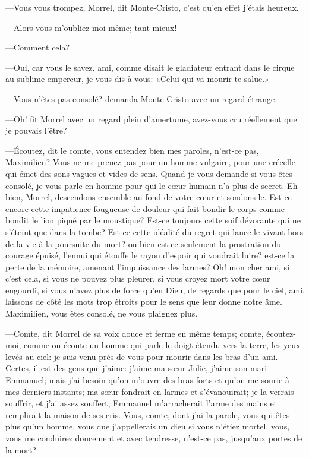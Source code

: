 —Vous vous trompez, Morrel, dit Monte-Cristo, c'est qu'en effet j'étais heureux. 

—Alors vous m'oubliez moi-même; tant mieux! 

—Comment cela? 

—Oui, car vous le savez, ami, comme disait le gladiateur entrant dans le cirque au sublime empereur, je vous dis à vous: «Celui qui va mourir te salue.» 

—Vous n'êtes pas consolé? demanda Monte-Cristo avec un regard étrange. 

—Oh! fit Morrel avec un regard plein d'amertume, avez-vous cru réellement que je pouvais l'être? 

—Écoutez, dit le comte, vous entendez bien mes paroles, n'est-ce pas, Maximilien? Vous ne me prenez pas pour un homme vulgaire, pour une crécelle qui émet des sons vagues et vides de sens. Quand je vous demande si vous êtes consolé, je vous parle en homme pour qui le cœur humain n'a plus de secret. Eh bien, Morrel, descendons ensemble au fond de votre cœur et sondons-le. Est-ce encore cette impatience fougueuse de douleur qui fait bondir le corps comme bondit le lion piqué par le moustique? Est-ce toujours cette soif dévorante qui ne s'éteint que dans la tombe? Est-ce cette idéalité du regret qui lance le vivant hors de la vie à la poursuite du mort? ou bien est-ce seulement la prostration du courage épuisé, l'ennui qui étouffe le rayon d'espoir qui voudrait luire? est-ce la perte de la mémoire, amenant l'impuissance des larmes? Oh! mon cher ami, si c'est cela, si vous ne pouvez plus pleurer, si vous croyez mort votre cœur engourdi, si vous n'avez plus de force qu'en Dieu, de regards que pour le ciel, ami, laissons de côté les mots trop étroits pour le sens que leur donne notre âme. Maximilien, vous êtes consolé, ne vous plaignez plus. 

—Comte, dit Morrel de sa voix douce et ferme en même temps; comte, écoutez-moi, comme on écoute un homme qui parle le doigt étendu vers la terre, les yeux levés au ciel: je suis venu près de vous pour mourir dans les bras d'un ami. Certes, il est des gens que j'aime: j'aime ma sœur Julie, j'aime son mari Emmanuel; mais j'ai besoin qu'on m'ouvre des bras forts et qu'on me sourie à mes derniers instants; ma sœur fondrait en larmes et s'évanouirait; je la verrais souffrir, et j'ai assez souffert; Emmanuel m'arracherait l'arme des mains et remplirait la maison de ses cris. Vous, comte, dont j'ai la parole, vous qui êtes plus qu'un homme, vous que j'appellerais un dieu si vous n'étiez mortel, vous, vous me conduirez doucement et avec tendresse, n'est-ce pas, jusqu'aux portes de la mort? 

